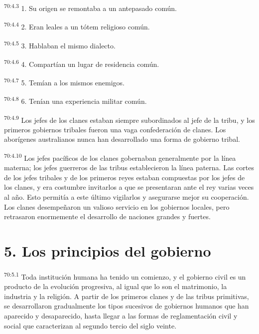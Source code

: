 \documentclass[twoside, 11pt]{book}
\begin{document}
\par
\textsuperscript{70:4.3} 1. Su origen se remontaba a un antepasado común.

\par
\textsuperscript{70:4.4} 2. Eran leales a un tótem religioso común.

\par
\textsuperscript{70:4.5} 3. Hablaban el mismo dialecto.

\par
\textsuperscript{70:4.6} 4. Compartían un lugar de residencia común.

\par
\textsuperscript{70:4.7} 5. Temían a los mismos enemigos.

\par
\textsuperscript{70:4.8} 6. Tenían una experiencia militar común.

\par
\textsuperscript{70:4.9} Los jefes de los clanes estaban siempre subordinados al jefe de la tribu, y los primeros gobiernos tribales fueron una vaga confederación de clanes. Los aborígenes australianos nunca han desarrollado una forma de gobierno tribal.

\par
\textsuperscript{70:4.10} Los jefes pacíficos de los clanes gobernaban generalmente por la línea materna; los jefes guerreros de las tribus establecieron la línea paterna. Las cortes de los jefes tribales y de los primeros reyes estaban compuestas por los jefes de los clanes, y era costumbre invitarlos a que se presentaran ante el rey varias veces al año. Esto permitía a este último vigilarlos y asegurarse mejor su cooperación. Los clanes desempeñaron un valioso servicio en los gobiernos locales, pero retrasaron enormemente el desarrollo de naciones grandes y fuertes.

\section*{5. Los principios del gobierno}
\par
\textsuperscript{70:5.1} Toda institución humana ha tenido un comienzo, y el gobierno civil es un producto de la evolución progresiva, al igual que lo son el matrimonio, la industria y la religión. A partir de los primeros clanes y de las tribus primitivas, se desarrollaron gradualmente los tipos sucesivos de gobiernos humanos que han aparecido y desaparecido, hasta llegar a las formas de reglamentación civil y social que caracterizan al segundo tercio del siglo veinte.
\end{document}

